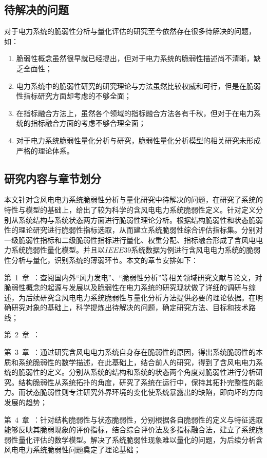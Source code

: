 \subsection{待解决的问题}
\label{sec:research_problem}
对于电力系统的脆弱性分析与量化评估的研究至今依然存在很多待解决的问题，如：
\begin{enumerate}[(1)]
  \item 脆弱性概念虽然很早就已经提出，但对于电力系统的脆弱性描述尚不清晰，缺乏全面性；
  \item 电力系统中的脆弱性研究的研究理论与方法虽然比较权威和可行，但是在脆弱性指标研究方面却考虑的不够全面；
  \item 在指标融合方法上，虽然各个领域的指标融合方法各有千秋，但对于在电力系统的指标融合方面的考虑不够合理全面；
  \item 对于电力系统脆弱性量化分析与研究，脆弱性量化分析模型的相关研究未形成严格的理论体系。
 \end{enumerate}

\subsection{研究内容与章节划分}
\label{sec:contendAndIdea}
本文针对含风电电力系统脆弱性分析与量化研究中待解决的问题，在研究了系统的特性与模型的基础上，给出了较为科学的含风电电力系统脆弱性定义。针对定义分别从系统结构与系统状态两方面进行脆弱性理论分析。根据结构脆弱性和状态脆弱性的理论研究进行脆弱性指标选取，从而建立系统脆弱性综合评估指标集。分别对一级脆弱性指标和二级脆弱性指标进行量化、权重分配、指标融合形成了含风电电力系统脆弱性量化模型。并且以$IEEE39$系统数据为例进行含风电电力系统的脆弱性分析与量化，识别系统的薄弱环节。本文的章节安排如下：

第~1~章~：查阅国内外“风力发电”、“脆弱性分析”等相关领域研究文献与论文，对脆弱性概念的起源与发展以及脆弱性在电力系统的研究现状做了详细的调研与综述，为后续研究含风电电力系统脆弱性与量化分析方法提供必要的理论依据。在明确研究对象的基础上，科学提炼出待解决的问题，确定研究方法、目标和技术路线；

第~2~章~：

第~3~章~：通过研究含风电电力系统自身存在脆弱性的原因，得出系统脆弱性的本质和系统脆弱性的数学描述，在此基础上，结合前人的研究，得到了含风电电力系统的脆弱性的定义。分别从系统的结构和系统的状态两个角度对脆弱性进行分析研究。结构脆弱性从系统拓扑的角度，研究了系统在运行中，保持其拓扑完整性的能力。而状态脆弱性则专注研究外界环境的变化使系统暴露出的缺陷，即向坏的方向发展的趋势；

第~4~章~：针对结构脆弱性与状态脆弱性，分别根据各自脆弱性的定义与特征选取能够反映其脆弱现象的评价指标，结合综合评价法及多指标融合法，建立了系统脆弱性量化评估的数学模型。解决了系统脆弱性现象难以量化的问题，为后续分析含风电电力系统脆弱性问题奠定了理论基础；

